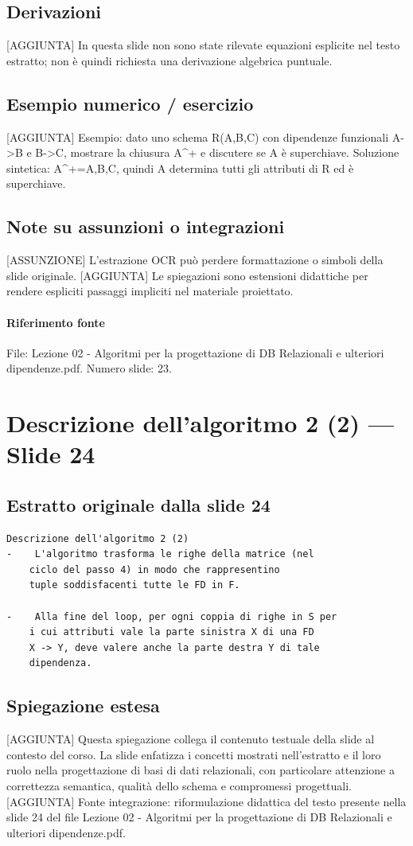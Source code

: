 \documentclass[11pt]{article}
\begin{document}
\subsection*{Derivazioni}
[AGGIUNTA] In questa slide non sono state rilevate equazioni esplicite nel testo estratto; non è quindi richiesta una derivazione algebrica puntuale.
\subsection*{Esempio numerico / esercizio}
[AGGIUNTA] Esempio: dato uno schema R(A,B,C) con dipendenze funzionali A->B e B->C, mostrare la chiusura A^+ e discutere se A è superchiave. Soluzione sintetica: A^+={A,B,C}, quindi A determina tutti gli attributi di R ed è superchiave.
\subsection*{Note su assunzioni o integrazioni}
[ASSUNZIONE] L'estrazione OCR può perdere formattazione o simboli della slide originale.
[AGGIUNTA] Le spiegazioni sono estensioni didattiche per rendere espliciti passaggi impliciti nel materiale proiettato.
\paragraph{Riferimento fonte} File: Lezione 02 - Algoritmi per la progettazione di DB Relazionali e ulteriori dipendenze.pdf. Numero slide: 23.
\section{Descrizione dell'algoritmo 2 (2) --- Slide 24}
\subsection*{Estratto originale dalla slide 24}
\begin{lstlisting}
Descrizione dell'algoritmo 2 (2)
-    L'algoritmo trasforma le righe della matrice (nel
    ciclo del passo 4) in modo che rappresentino
    tuple soddisfacenti tutte le FD in F.

-    Alla fine del loop, per ogni coppia di righe in S per
    i cui attributi vale la parte sinistra X di una FD
    X -> Y, deve valere anche la parte destra Y di tale
    dipendenza.
\end{lstlisting}
\subsection*{Spiegazione estesa}
[AGGIUNTA] Questa spiegazione collega il contenuto testuale della slide al contesto del corso. La slide enfatizza i concetti mostrati nell'estratto e il loro ruolo nella progettazione di basi di dati relazionali, con particolare attenzione a correttezza semantica, qualità dello schema e compromessi progettuali.
[AGGIUNTA] Fonte integrazione: riformulazione didattica del testo presente nella slide 24 del file Lezione 02 - Algoritmi per la progettazione di DB Relazionali e ulteriori dipendenze.pdf.
\end{document}
